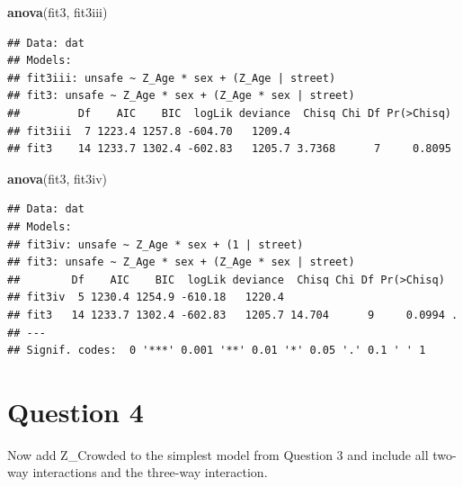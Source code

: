 \documentclass[]{article}
\newenvironment{Shaded}{\begin{snugshade}}{\end{snugshade}}
\newcommand{\KeywordTok}[1]{\textcolor[rgb]{0.13,0.29,0.53}{\textbf{#1}}}
\newcommand{\NormalTok}[1]{#1}
\begin{document}
\begin{Shaded}
\begin{Highlighting}[]
\KeywordTok{anova}\NormalTok{(fit3, fit3iii)}
\end{Highlighting}
\end{Shaded}

\begin{verbatim}
## Data: dat
## Models:
## fit3iii: unsafe ~ Z_Age * sex + (Z_Age | street)
## fit3: unsafe ~ Z_Age * sex + (Z_Age * sex | street)
##         Df    AIC    BIC  logLik deviance  Chisq Chi Df Pr(>Chisq)
## fit3iii  7 1223.4 1257.8 -604.70   1209.4                         
## fit3    14 1233.7 1302.4 -602.83   1205.7 3.7368      7     0.8095
\end{verbatim}

\begin{Shaded}
\begin{Highlighting}[]
\KeywordTok{anova}\NormalTok{(fit3, fit3iv)}
\end{Highlighting}
\end{Shaded}

\begin{verbatim}
## Data: dat
## Models:
## fit3iv: unsafe ~ Z_Age * sex + (1 | street)
## fit3: unsafe ~ Z_Age * sex + (Z_Age * sex | street)
##        Df    AIC    BIC  logLik deviance  Chisq Chi Df Pr(>Chisq)  
## fit3iv  5 1230.4 1254.9 -610.18   1220.4                           
## fit3   14 1233.7 1302.4 -602.83   1205.7 14.704      9     0.0994 .
## ---
## Signif. codes:  0 '***' 0.001 '**' 0.01 '*' 0.05 '.' 0.1 ' ' 1
\end{verbatim}

\section{Question 4}\label{question-4}

Now add Z\_Crowded to the simplest model from Question 3 and include all
two-way interactions and the three-way interaction.
\end{document}

